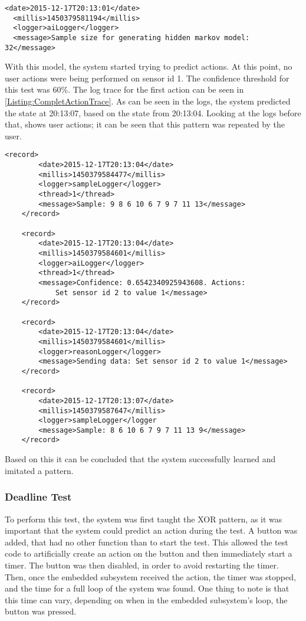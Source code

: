 \lstset{language=xml}
\begin{lstlisting}[label = Listing:MarkovGenLog, caption = Snippet of log from model generation]
  <date>2015-12-17T20:13:01</date>
  <millis>1450379581194</millis>
  <logger>aiLogger</logger>  
  <message>Sample size for generating hidden markov model: 32</message>
\end{lstlisting}

With this model, the system started trying to predict actions. At this point, no user actions were being performed on sensor id 1. The confidence threshold for this test was 60\%. The log trace for the first action can be seen in \cref{Listing:CompletActionTrace}. As can be seen in the logs, the system predicted the state at 20:13:07, based on the state from 20:13:04. Looking at the logs before that, shows user actions; it can be seen that this pattern was repeated by the user.

\begin{lstlisting}[label = Listing:CompletActionTrace, caption = Snippets from different logs to show how the process of making an action]
    <record>
        <date>2015-12-17T20:13:04</date>
        <millis>1450379584477</millis>
        <logger>sampleLogger</logger>
        <thread>1</thread>
        <message>Sample: 9 8 6 10 6 7 9 7 11 13</message>
    </record>

    <record>
        <date>2015-12-17T20:13:04</date>
        <millis>1450379584601</millis>
        <logger>aiLogger</logger>
        <thread>1</thread>
        <message>Confidence: 0.6542340925943608. Actions: 
            Set sensor id 2 to value 1</message>
    </record>

    <record>
        <date>2015-12-17T20:13:04</date>
        <millis>1450379584601</millis>
        <logger>reasonLogger</logger>
        <message>Sending data: Set sensor id 2 to value 1</message>
    </record>

    <record>
        <date>2015-12-17T20:13:07</date>
        <millis>1450379587647</millis>
        <logger>sampleLogger</logger
        <message>Sample: 8 6 10 6 7 9 7 11 13 9</message>
    </record>
\end{lstlisting}

Based on this it can be concluded that the system successfully learned and imitated a pattern.

\subsubsection{Deadline Test}
To perform this test, the system was first taught the XOR pattern, as it was important that the system could predict an action during the test. A button was added, that had no other function than to start the test. This allowed the test code to artificially create an action on the button and then immediately start a timer. The button was then disabled, in order to avoid restarting the timer. Then, once the embedded subsystem received the action, the timer was stopped, and the time for a full loop of the system was found. One thing to note is that this time can vary, depending on when in the embedded subsystem's loop, the button was pressed.

